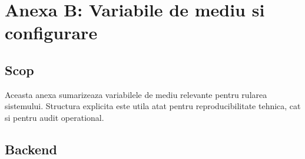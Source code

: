 \chapter{Anexa B: Variabile de mediu si configurare}

\section{Scop}

Aceasta anexa sumarizeaza variabilele de mediu relevante pentru rularea sistemului. Structura explicita este utila atat pentru reproducibilitate tehnica, cat si pentru audit operational.

\section{Backend}

